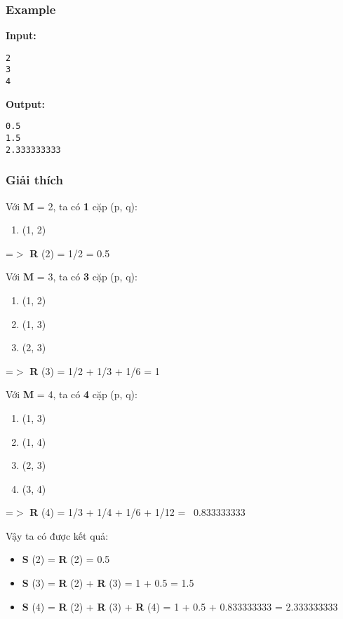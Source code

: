 \subsubsection{   Example  }

\textbf{    Input:   }
\begin{verbatim}
2
3
4
\end{verbatim}

\textbf{    Output:   }
\begin{verbatim}
0.5
1.5
2.333333333\end{verbatim}

\subsubsection{   Giải thích  }

   Với   \textbf{    M   }   = 2, ta có   \textbf{    1   }   cặp (p, q):  
\begin{enumerate}
	\item     (1, 2)   
\end{enumerate}

   =$>$   \textbf{    R   }   (2) = 1/2 = 0.5  

   Với   \textbf{    M   }   = 3, ta có   \textbf{    3   }   cặp (p, q):  
\begin{enumerate}
	\item     (1, 2)   
	\item     (1, 3)   
	\item     (2, 3)   
\end{enumerate}

   =$>$   \textbf{    R   }   (3) = 1/2 + 1/3 + 1/6 = 1  

   Với   \textbf{    M   }   = 4, ta có   \textbf{    4   }   cặp (p, q):  
\begin{enumerate}
	\item     (1, 3)   
	\item     (1, 4)   
	\item     (2, 3)   
	\item     (3, 4)   
\end{enumerate}

   =$>$   \textbf{    R   }   (4) = 1/3 + 1/4 + 1/6 + 1/12 =  0.833333333  

   Vậy ta có được kết quả:  
\begin{itemize}
	\item \textbf{     S    }    (2) =    \textbf{     R    }    (2) = 0.5   
	\item \textbf{     S    }    (3) =    \textbf{     R    }    (2) +    \textbf{     R    }    (3) = 1 + 0.5 = 1.5   
	\item \textbf{     S    }    (4) =    \textbf{     R    }    (2) +    \textbf{     R    }    (3) +    \textbf{     R    }    (4) = 1 + 0.5 + 0.833333333 = 2.333333333   
\end{itemize}
